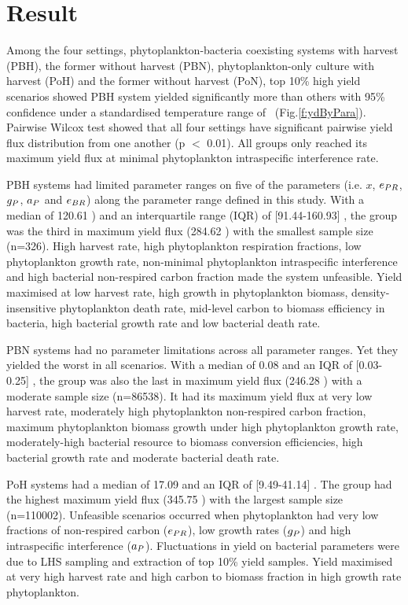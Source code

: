 \documentclass[../thesis.tex]{subfiles} %
\begin{document}
\section{Result}
Among the four settings, phytoplankton-bacteria coexisting systems with harvest (PBH), the former without harvest (PBN), phytoplankton-only culture with harvest (PoH) and the former without harvest (PoN), top 10\% high yield scenarios showed PBH system yielded significantly more than others with 95\% confidence under a standardised temperature range of \temp\ (Fig.\ref{f:ydByPara}).  Pairwise Wilcox test showed that all four settings have significant pairwise yield flux distribution from one another (p $<$ 0.01).  All groups only reached its maximum yield flux at minimal phytoplankton intraspecific interference rate.

PBH systems had limited parameter ranges on five of the parameters (i.e. $x$, $e_{PR}$, $g_P$, $a_P$ and $e_{BR}$) along the parameter range defined in this study.  With a median of 120.61 \dxdt) and an interquartile range (IQR) of [91.44-160.93] \dxdt, the group was the third in maximum yield flux (284.62 \dxdt) with the smallest sample size (n=326).  High harvest rate, high phytoplankton respiration fractions, low phytoplankton growth rate, non-minimal phytoplankton intraspecific interference and high bacterial non-respired carbon fraction made the system unfeasible.  Yield maximised at low harvest rate, high growth in phytoplankton biomass, density-insensitive phytoplankton death rate, mid-level carbon to biomass efficiency in bacteria, high bacterial growth rate and low bacterial death rate.

PBN systems had no parameter limitations across all parameter ranges.  Yet they yielded the worst in all scenarios.  With a median of 0.08 \dxdt and an IQR of [0.03-0.25] \dxdt, the group was also the last in maximum yield flux (246.28 \dxdt) with a moderate sample size (n=86538).  It had its maximum yield flux at very low harvest rate, moderately high phytoplankton non-respired carbon fraction, maximum phytoplankton biomass growth under high phytoplankton growth rate, moderately-high bacterial resource to biomass conversion efficiencies, high bacterial growth rate and moderate bacterial death rate.  

PoH systems had a median of 17.09 \dxdt and an IQR of [9.49-41.14] \dxdt.  The group had the highest maximum yield flux (345.75 \dxdt) with the largest sample size (n=110002).  Unfeasible scenarios occurred when phytoplankton had very low fractions of non-respired carbon ($e_{PR}$), low growth rates ($g_P$) and high intraspecific interference ($a_P$).  Fluctuations in yield on bacterial parameters were due to LHS sampling and extraction of top 10\% yield samples.  Yield maximised at very high harvest rate and high carbon to biomass fraction in high growth rate phytoplankton.
\end{document}
